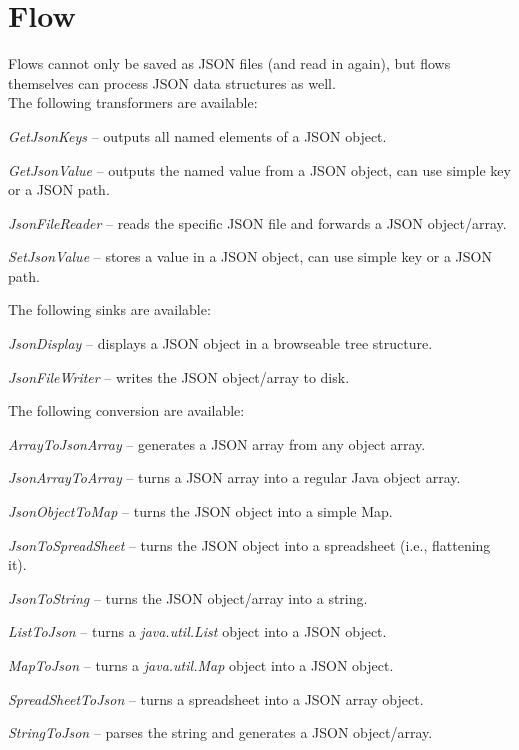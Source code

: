 \documentclass[a4paper]{book}
\begin{document}
\chapter{Flow}
Flows cannot only be saved as JSON\cite{json} files (and read in again), but flows
themselves can process JSON data structures as well. \\
The following transformers are available:
\begin{tight_itemize}
	\item \textit{GetJsonKeys} -- outputs all named elements
	of a JSON object.
	\item \textit{GetJsonValue} -- outputs the named value
	from a JSON object, can use simple key or a JSON
	path\cite{jsonpath}.
	\item \textit{JsonFileReader} -- reads the specific JSON file and forwards
	a JSON object/array.
	\item \textit{SetJsonValue} -- stores a value in a JSON object, can
	use simple key or a JSON path\cite{jsonpath}.
\end{tight_itemize}
The following sinks are available:
\begin{tight_itemize}
	\item \textit{JsonDisplay} -- displays a JSON object in a browseable
	tree structure.
	\item \textit{JsonFileWriter} -- writes the JSON object/array to disk.
\end{tight_itemize}
The following conversion are available:
\begin{tight_itemize}
	\item \textit{ArrayToJsonArray} -- generates a JSON array from any object
	array.
	\item \textit{JsonArrayToArray} -- turns a JSON array into a regular Java
	object array.
	\item \textit{JsonObjectToMap} -- turns the JSON object into a simple Map.
	\item \textit{JsonToSpreadSheet} -- turns the JSON object into a spreadsheet (i.e., flattening it).
	\item \textit{JsonToString} -- turns the JSON object/array into a string.
	\item \textit{ListToJson} -- turns a \textit{java.util.List} object
	into a JSON object.
	\item \textit{MapToJson} -- turns a \textit{java.util.Map} object
	into a JSON object.
	\item \textit{SpreadSheetToJson} -- turns a spreadsheet into a JSON array object.
	\item \textit{StringToJson} -- parses the string and generates a JSON
	object/array.
\end{tight_itemize}
\end{document}
